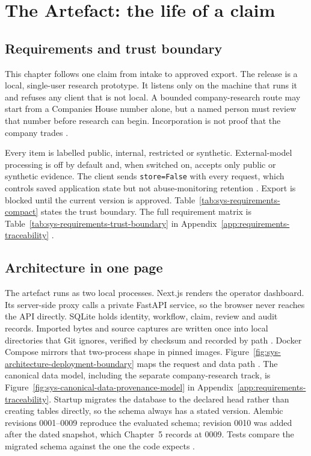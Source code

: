 \chapter{The Artefact: the life of a claim}
\section{Requirements and trust boundary}

This chapter follows one claim from intake to approved export. The release is a local, single-user
research prototype. It listens only on the machine that runs it and refuses any client that is not
local. A bounded company-research route may start from a Companies House number alone, but a named
person must review that number before research can begin. Incorporation is not proof that the company
trades \citep{galanakis2026chrt,hardman2023small}.

Every item is labelled public, internal, restricted or synthetic. External-model processing is off by
default and, when switched on, accepts only public or synthetic evidence. The client sends
\texttt{store=False} with every request, which controls saved application state but not
abuse-monitoring retention \citep{gebru2021datasheets,openai2026datacontrols}. Export is blocked until
the current version is approved. Table~\ref{tab:sys-requirements-compact} states the trust boundary.
The full requirement matrix is Table~\ref{tab:sys-requirements-trust-boundary} in
Appendix~\ref{app:requirements-traceability} \citep{fca2024promotions,nist2023airmf}.



\section{Architecture in one page}

The artefact runs as two local processes. Next.js renders the operator dashboard. Its server-side
proxy calls a private FastAPI service, so the browser never reaches the API directly. SQLite holds
identity, workflow, claim, review and audit records. Imported bytes and source captures are written
once into local directories that Git ignores, verified by checksum and recorded by path
\citep{pineau2021reproducibility,gebru2021datasheets}. Docker Compose mirrors that two-process shape
in pinned images. Figure~\ref{fig:sys-architecture-deployment-boundary} maps the request and data
path \citep{hevner2004design,nist2023airmf}. The canonical data model, including the separate
company-research track, is Figure~\ref{fig:sys-canonical-data-provenance-model} in
Appendix~\ref{app:requirements-traceability}. Startup migrates the database to the declared head
rather than creating tables directly, so the schema always has a stated version. Alembic revisions
0001--0009 reproduce the evaluated schema; revision 0010 was added after the dated snapshot, which
Chapter~5 records at 0009. Tests compare the migrated schema against the one the code expects
\citep{pineau2021reproducibility,gebru2021datasheets}.

